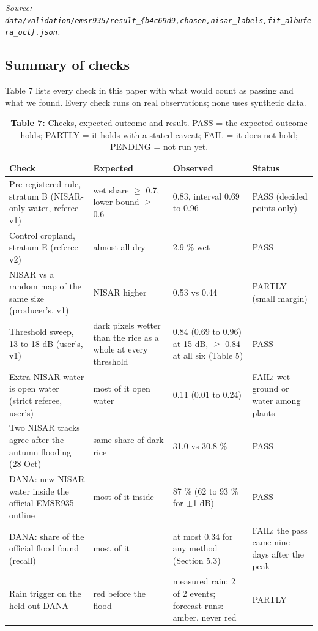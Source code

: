 \documentclass[10pt,twocolumn]{article}
\begin{document}
\emph{Source: \texttt{data/\allowbreak{}validation/\allowbreak{}emsr935/\allowbreak{}result\_\allowbreak{}\{b4c69d9,chosen,nisar\_\allowbreak{}labels,fit\_\allowbreak{}albufera\_\allowbreak{}oct\}.\allowbreak{}json}.}

\subsection{Summary of checks}
Table 7 lists every check in this paper with what would count as passing and what we found. Every check runs on real observations; none uses synthetic data.

\begin{table}[tbp]
\centering
\caption{\textbf{Table 7:} Checks, expected outcome and result. PASS = the expected outcome holds; PARTLY = it holds with a stated caveat; FAIL = it does not hold; PENDING = not run yet.}
\footnotesize
\begin{tabularx}{\textwidth}{LLLL}
\toprule
\textbf{Check} & \textbf{Expected} & \textbf{Observed} & \textbf{Status} \\
\midrule
{}Pre-registered rule, stratum B (NISAR-only water, referee v1) & wet share $\geq$ 0.7, lower bound $\geq$ 0.6 & 0.83, interval 0.69 to 0.96 & PASS (decided points only) \\
{}Control cropland, stratum E (referee v2) & almost all dry & 2.9 \% wet & PASS \\
{}NISAR vs a random map of the same size (producer's, v1) & NISAR higher & 0.53 vs 0.44 & PARTLY (small margin) \\
{}Threshold sweep, \textminus{}13 to \textminus{}18 dB (user's, v1) & dark pixels wetter than the rice as a whole at every threshold & 0.84 (0.69 to 0.96) at \textminus{}15 dB, $\geq$ 0.84 at all six (Table 5) & PASS \\
{}Extra NISAR water is open water (strict referee, user's) & most of it open water & 0.11 (0.01 to 0.24) & FAIL: wet ground or water among plants \\
{}Two NISAR tracks agree after the autumn flooding (28 Oct) & same share of dark rice & 31.0 vs 30.8 \% & PASS \\
{}DANA: new NISAR water inside the official EMSR935 outline & most of it inside & 87 \% (62 to 93 \% for $\pm$1 dB) & PASS \\
{}DANA: share of the official flood found (recall) & most of it & at most 0.34 for any method (Section 5.3) & FAIL: the pass came nine days after the peak \\
{}Rain trigger on the held-out DANA & red before the flood & measured rain: 2 of 2 events; forecast runs: amber, never red & PARTLY \\

\end{tabularx}
\end{table}
\end{document}
